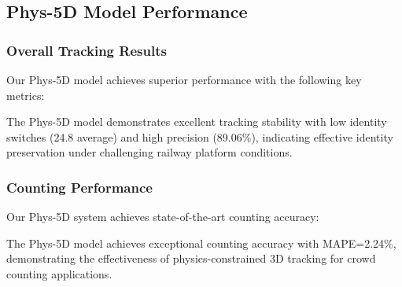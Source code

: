\subsection{Phys-5D Model Performance}

\subsubsection{Overall Tracking Results}
Our Phys-5D model achieves superior performance with the following key metrics:

\begin{table}[h]
\centering
{}
\caption{Phys-5D Model Performance}
\label{tab:Phys5D_Performance}
\end{table}

The Phys-5D model demonstrates excellent tracking stability with low identity switches (24.8 average) and high precision (89.06\%), indicating effective identity preservation under challenging railway platform conditions.

\subsubsection{Counting Performance}
Our Phys-5D system achieves state-of-the-art counting accuracy:

\begin{table}[h]
\centering
{}
\caption{Phys-5D Counting Performance}
\label{tab:Phys5D_Counting}
\end{table}

The Phys-5D model achieves exceptional counting accuracy with MAPE=2.24\%, demonstrating the effectiveness of physics-constrained 3D tracking for crowd counting applications.

